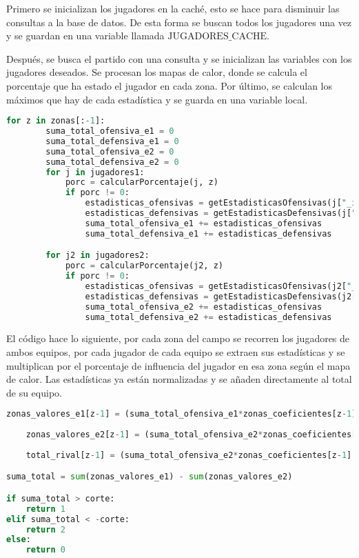 Primero se inicializan los jugadores en la caché, esto se hace para disminuir las consultas a la base de datos. De esta forma se buscan todos los jugadores una vez y se guardan en una variable llamada $\text{JUGADORES\_CACHE}$.

Después, se busca el partido con una consulta y se inicializan las variables con los jugadores deseados. Se procesan los mapas de calor, donde se calcula el porcentaje que ha estado el jugador en cada zona. Por último, se calculan los máximos que hay de cada estadística y se guarda en una variable local.

\begin{lstlisting}[language=Python, caption={Procesamiento de cada zona}, label={lst:codigo-python}]
for z in zonas[:-1]:
        suma_total_ofensiva_e1 = 0
        suma_total_defensiva_e1 = 0
        suma_total_ofensiva_e2 = 0
        suma_total_defensiva_e2 = 0
        for j in jugadores1:
            porc = calcularPorcentaje(j, z)
            if porc != 0:
                estadisticas_ofensivas = getEstadisticasOfensivas(j["_id"], maximos) * porc
                estadisticas_defensivas = getEstadisticasDefensivas(j["_id"], maximos) * porc
                suma_total_ofensiva_e1 += estadisticas_ofensivas
                suma_total_defensiva_e1 += estadisticas_defensivas

        for j2 in jugadores2:
            porc = calcularPorcentaje(j2, z)
            if porc != 0:
                estadisticas_ofensivas = getEstadisticasOfensivas(j2["_id"], maximos) * porc
                estadisticas_defensivas = getEstadisticasDefensivas(j2["_id"], maximos) * porc
                suma_total_ofensiva_e2 += estadisticas_ofensivas
                suma_total_defensiva_e2 += estadisticas_defensivas

\end{lstlisting}

El código hace lo siguiente, por cada zona del campo se recorren los jugadores de ambos equipos, por cada jugador de cada equipo se extraen sus estadísticas y se multiplican por el porcentaje de influencia del jugador en esa zona según el mapa de calor. Las estadísticas ya están normalizadas y se añaden directamente al total de su equipo.

\begin{lstlisting}[language=Python, caption={Procesamiento de cada zona}, label={lst:codigo-python}]
    zonas_valores_e1[z-1] = (suma_total_ofensiva_e1*zonas_coeficientes[z-1] - suma_total_defensiva_e2*zonas_coeficientes[z-1+24])
    
    zonas_valores_e2[z-1] = (suma_total_ofensiva_e2*zonas_coeficientes[z-1] - suma_total_defensiva_e1*zonas_coeficientes[z-1+24])
    
    total_rival[z-1] = (suma_total_ofensiva_e2*zonas_coeficientes[z-1] + suma_total_defensiva_e1*zonas_coeficientes[z-1+24])

suma_total = sum(zonas_valores_e1) - sum(zonas_valores_e2)

if suma_total > corte:
    return 1
elif suma_total < -corte:
    return 2
else:
    return 0

\end{lstlisting}

